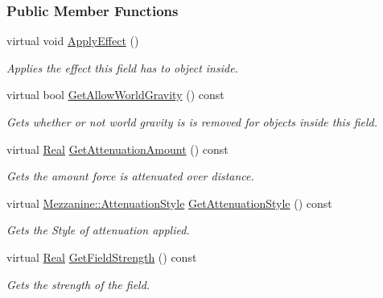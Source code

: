 \subsubsection*{Public Member Functions}
\begin{DoxyCompactItemize}
\item 
virtual void \hyperlink{classMezzanine_1_1GravityWell_a193e1683edaf80bb1a37979f196abf6e}{ApplyEffect} ()
\begin{DoxyCompactList}\small\item\em Applies the effect this field has to object inside. \item\end{DoxyCompactList}\item 
virtual bool \hyperlink{classMezzanine_1_1GravityWell_afa34a6efc22c6d8875be96cfce90c013}{GetAllowWorldGravity} () const 
\begin{DoxyCompactList}\small\item\em Gets whether or not world gravity is is removed for objects inside this field. \item\end{DoxyCompactList}\item 
virtual \hyperlink{namespaceMezzanine_a726731b1a7df72bf3583e4a97282c6f6}{Real} \hyperlink{classMezzanine_1_1GravityWell_aa077b3ef75a442b97f34bb578a7354eb}{GetAttenuationAmount} () const 
\begin{DoxyCompactList}\small\item\em Gets the amount force is attenuated over distance. \item\end{DoxyCompactList}\item 
virtual \hyperlink{namespaceMezzanine_a2d10a79e11a2031df10af540eede12fa}{Mezzanine::AttenuationStyle} \hyperlink{classMezzanine_1_1GravityWell_ad26c5b44056826e55dac112d0e0600a7}{GetAttenuationStyle} () const 
\begin{DoxyCompactList}\small\item\em Gets the Style of attenuation applied. \item\end{DoxyCompactList}\item 
virtual \hyperlink{namespaceMezzanine_a726731b1a7df72bf3583e4a97282c6f6}{Real} \hyperlink{classMezzanine_1_1GravityWell_a8fe42eeeb7483c35f1dfae170c2b2ec9}{GetFieldStrength} () const 
\begin{DoxyCompactList}\small\item\em Gets the strength of the field. \item\end{DoxyCompactList}\item 

\end{DoxyCompactItemize}
